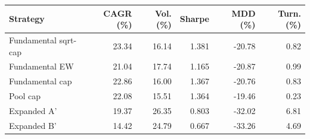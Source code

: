 \begin{tabular}{lrrrrr}
\toprule
Strategy & CAGR (\%) & Vol. (\%) & Sharpe & MDD (\%) & Turn. (\%) \\
\midrule
Fundamental sqrt-cap & 23.34 & 16.14 & 1.381 & -20.78 & 0.82 \\
Fundamental EW & 21.04 & 17.74 & 1.165 & -20.87 & 0.99 \\
Fundamental cap & 22.86 & 16.00 & 1.367 & -20.76 & 0.83 \\
Pool cap & 22.08 & 15.51 & 1.364 & -19.46 & 0.23 \\
Expanded A' & 19.37 & 26.35 & 0.803 & -32.02 & 6.81 \\
Expanded B' & 14.42 & 24.79 & 0.667 & -33.26 & 4.69 \\
\bottomrule
\end{tabular}
